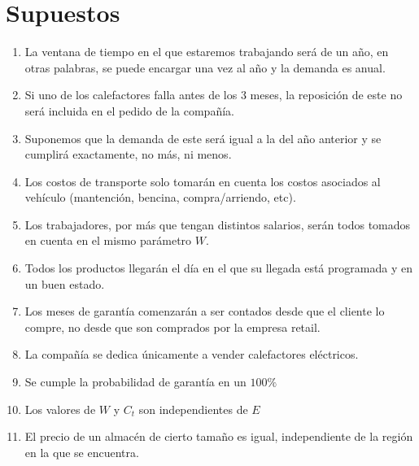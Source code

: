 \documentclass[12pt]{report}
\begin{document}
\section*{Supuestos}


\begin{enumerate}
    \item La ventana de tiempo en el que estaremos trabajando ser\'a de un a\~no, en otras palabras, se puede encargar una vez al a\~no y la demanda es anual.
    \item Si uno de los calefactores falla antes de los 3 meses, la reposici\'on de este no ser\'a incluida en el pedido de la compa\~n\'ia.
    \item Suponemos que la demanda de este  ser\'a igual a la del a\~no anterior y se cumplir\'a exactamente, no m\'as, ni menos.
    \item Los costos de transporte solo tomar\'an en cuenta los costos asociados al veh\'iculo (mantenci\'on, bencina, compra/arriendo, etc).
    \item Los trabajadores, por m\'as que tengan distintos salarios, ser\'an todos tomados en cuenta en el mismo par\'ametro $W$.
    \item Todos los productos llegar\'an el d\'ia en el que su llegada est\'a programada y en un buen estado.
    \item Los meses de garant\'ia comenzar\'an a ser contados desde que el cliente lo compre, no desde que son comprados por la empresa retail.
    \item La compa\~n\'ia se dedica \'unicamente a vender calefactores el\'ectricos.
    \item Se cumple la probabilidad de garant\'ia en un $100\%$
    \item Los valores de $W$ y $C_{t}$ son independientes de $E$
    \item El precio de un almac\'en de cierto tama\~no es igual, independiente de la regi\'on en la que se encuentra.
\end{enumerate}




\end{document}
